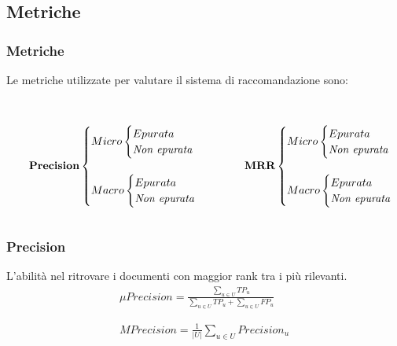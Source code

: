 \documentclass{beamer}
\begin{document}
\subsection{Metriche}
\begin{frame}
	\frametitle{Metriche}
	Le metriche utilizzate per valutare il sistema di raccomandazione sono: \\~\\
	\begin{columns}
		\begin{column}{0.55\textwidth}	
			\begin{equation*}
				\qquad \textbf{Precision}
				\begin{cases} 
					Micro 
					\begin{cases} 
						Epurata \\ \mbox{\emph{Non epurata}}
					\end{cases} 
					\\~\\ Macro 
					\begin{cases} 
						Epurata \\ \mbox{\emph{Non epurata}}
					\end{cases}
				\end{cases}
			\end{equation*}
		\end{column}
		\begin{column}{0.6\textwidth}
			\begin{equation*}
				\qquad \textbf{MRR}
				\begin{cases} 
					Micro
					\begin{cases} 
						Epurata \\ \mbox{\emph{Non epurata}}
					\end{cases} 
					\\~\\ Macro 
					\begin{cases} 
						Epurata \\ \mbox{\emph{Non epurata}}
					\end{cases}
				\end{cases}
			\end{equation*}
		\end{column}
	\end{columns}
\end{frame}


\begin{frame}
	\frametitle{Precision}
	L'abilità nel ritrovare i documenti con maggior rank tra i più rilevanti.
	\begin{align*}
		\mu Precision =\frac{\sum\limits_{u\in U}^{}TP_u}{\sum\limits_{u\in U}^{}TP_u+\sum\limits_{u\in U}^{}FP_u} \\\\~\\
		MPrecision =\frac{1}{|U|}\sum\limits_{u\in U}{Precision_u}
	\end{align*}
\end{frame}
\end{document}

